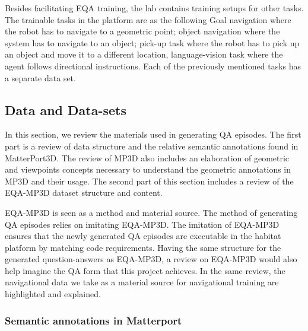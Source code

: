 Besides facilitating EQA training, the lab contains training setups for other tasks. The trainable tasks in the platform are as the following
Goal navigation where the robot has to navigate to a geometric point;
object navigation where the system has to navigate to an object;
pick-up task where the robot has to pick up an object and move it to a different location, language-vision task where the agent follows directional instructions.
Each of the previously mentioned tasks has a separate data set. 



%
%
%
%

\subsection{Data and Data-sets}

In this section, we review the materials used in generating QA episodes. The first part is a review of data structure and the relative semantic annotations found in MatterPort3D. The review of MP3D also includes an elaboration of geometric and viewpoints concepts necessary to understand the geometric annotations in MP3D and their usage. The second part of this section includes a review of the EQA-MP3D dataset structure and content.

EQA-MP3D is seen as a method and material source. The method of generating QA episodes relies on imitating EQA-MP3D. The imitation of EQA-MP3D ensures that the newly generated QA episodes are executable in the habitat platform by matching code requirements. Having the same structure for the generated question-answers as EQA-MP3D, a review on EQA-MP3D would also help imagine the QA form that this project achieves.   In the same review, the navigational data we take as a material source for navigational training are highlighted and explained. 

\subsubsection{Semantic annotations in Matterport}

